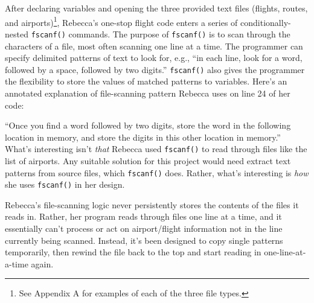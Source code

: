 After declaring variables and opening the three provided text files (flights, routes, and airports)\footnote{See Appendix A for examples of each of the three file types.}, Rebecca's one-stop flight code enters a series of conditionally-nested \texttt{fscanf()} commands. The purpose of \texttt{fscanf()} is to scan through the characters of a file, most often scanning one line at a time. The programmer can specify delimited patterns of text to look for, e.g., ``in each line, look for a word, followed by a space, followed by two digits.'' \texttt{fscanf()} also gives the programmer the flexibility to store the values of matched patterns to variables. Here's an annotated explanation of file-scanning pattern Rebecca uses on line 24 of her code:

\begin{Shaded}
\end{Shaded}

``Once you find a word followed by two digits, store the word in the following location in memory, and store the digits in this other location in memory.'' What's interesting isn't \emph{that} Rebecca used \texttt{fscanf()} to read through files like the list of airports. Any suitable solution for this project would need extract text patterns from source files, which \texttt{fscanf()} does. Rather, what's interesting is \emph{how} she uses \texttt{fscanf()} in her design.

Rebecca's file-scanning logic never persistently stores the contents of the files it reads in. Rather, her program reads through files one line at a time, and it essentially can't process or act on airport/flight information not in the line currently being scanned. Instead, it's been designed to copy single patterns temporarily, then rewind the file back to the top and start reading in one-line-at-a-time again.

